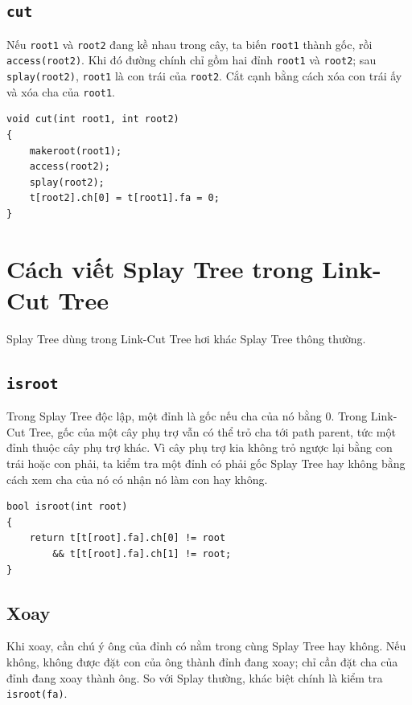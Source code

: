 \documentclass[11pt]{article}
\begin{document}
\subsection{\texttt{cut}}

Nếu \texttt{root1} và \texttt{root2} đang kề nhau trong cây, ta biến
\texttt{root1} thành gốc, rồi \texttt{access(root2)}.  Khi đó đường chính chỉ
gồm hai đỉnh \texttt{root1} và \texttt{root2}; sau \texttt{splay(root2)},
\texttt{root1} là con trái của \texttt{root2}.  Cắt cạnh bằng cách xóa con
trái ấy và xóa cha của \texttt{root1}.

\begingroup
\small
\begin{verbatim}
void cut(int root1, int root2)
{
    makeroot(root1);
    access(root2);
    splay(root2);
    t[root2].ch[0] = t[root1].fa = 0;
}
\end{verbatim}
\endgroup

\section{Cách viết Splay Tree trong Link-Cut Tree}

Splay Tree dùng trong Link-Cut Tree hơi khác Splay Tree thông thường.

\subsection{\texttt{isroot}}

Trong Splay Tree độc lập, một đỉnh là gốc nếu cha của nó bằng $0$.  Trong
Link-Cut Tree, gốc của một cây phụ trợ vẫn có thể trỏ cha tới path parent, tức
một đỉnh thuộc cây phụ trợ khác.  Vì cây phụ trợ kia không trỏ ngược lại bằng
con trái hoặc con phải, ta kiểm tra một đỉnh có phải gốc Splay Tree hay không
bằng cách xem cha của nó có nhận nó làm con hay không.

\begingroup
\small
\begin{verbatim}
bool isroot(int root)
{
    return t[t[root].fa].ch[0] != root
        && t[t[root].fa].ch[1] != root;
}
\end{verbatim}
\endgroup

\subsection{Xoay}

Khi xoay, cần chú ý ông của đỉnh có nằm trong cùng Splay Tree hay không.  Nếu
không, không được đặt con của ông thành đỉnh đang xoay; chỉ cần đặt cha của
đỉnh đang xoay thành ông.  So với Splay thường, khác biệt chính là kiểm tra
\texttt{isroot(fa)}.
\end{document}
